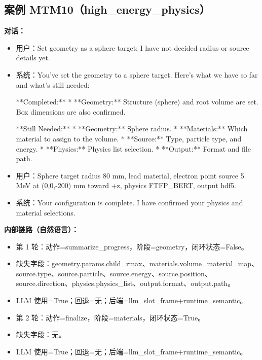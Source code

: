 \documentclass[11pt]{ctexart}
\begin{document}
\subsection{案例 MTM10（high\_energy\_physics）}
\textbf{对话：}
\begin{itemize}
\item 用户：Set geometry as a sphere target; I have not decided radius or source details yet.
\item 系统：You've set the geometry to a sphere target. Here's what we have so far and what's still needed:

**Completed:**
*   **Geometry:** Structure (sphere) and root volume are set. Box dimensions are also confirmed.

**Still Needed:**
*   **Geometry:** Sphere radius.
*   **Materials:** Which material to assign to the volume.
*   **Source:** Type, particle type, and energy.
*   **Physics:** Physics list selection.
*   **Output:** Format and file path.
\item 用户：Sphere target radius 80 mm, lead material, electron point source 5 MeV at (0,0,-200) mm toward +z, physics FTFP\_BERT, output hdf5.
\item 系统：Your configuration is complete. I have confirmed your physics and material selections.
\end{itemize}
\textbf{内部链路（自然语言）：}
\begin{itemize}
\item 第 1 轮：动作=summarize\_progress，阶段=geometry，闭环状态=False。
\item 缺失字段：geometry.params.child\_rmax、materials.volume\_material\_map、source.type、source.particle、source.energy、source.position、source.direction、physics.physics\_list、output.format、output.path。
\item LLM 使用=True；回退=无；后端=llm\_slot\_frame+runtime\_semantic。
\item 第 2 轮：动作=finalize，阶段=materials，闭环状态=True。
\item 缺失字段：无。
\item LLM 使用=True；回退=无；后端=llm\_slot\_frame+runtime\_semantic。
\end{itemize}
\end{document}
